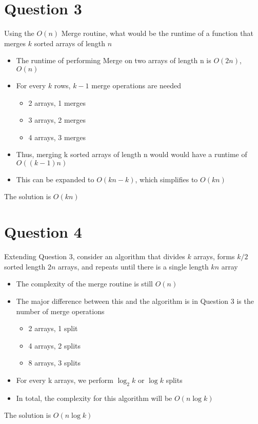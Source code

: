 \documentclass{report}
\begin{document}
    \section{Question 3}
    Using the $O(n)$ Merge routine, what would be the runtime of a function that merges $k$ sorted arrays of length $n$
        \begin{itemize}
            \item{The runtime of performing Merge on two arrays of length n is $O(2n)$, $O(n)$}
            \item{For every $k$ rows, $k - 1$ merge operations are needed}
                \begin{itemize}
                    \item{2 arrays, 1 merges}
                    \item{3 arrays, 2 merges}
                    \item{4 arrays, 3 merges}
                \end{itemize}
            \item{Thus, merging k sorted arrays of length n would would have a runtime of $O((k-1)n)$}
            \item{This can be expanded to $O(kn - k)$, which simplifies to $O(kn)$}
        \end{itemize}
        The solution is $O(kn)$

    \section{Question 4}
    Extending Question 3, consider an algorithm that divides $k$ arrays, forms $k/2$ sorted length $2n$ arrays,
    and repeats until there is a single length $kn$ array
        \begin{itemize}
            \item{The complexity of the merge routine is still $O(n)$}
            \item{The major difference between this and the algorithm is in Question 3 is the number of merge operations}
                \begin{itemize}
                  \item{2 arrays, 1 split}
                  \item{4 arrays, 2 splits}
                  \item{8 arrays, 3 splits}
                \end{itemize}
            \item{For every k arrays, we perform $\log_2 k$ or $\log k$ splits}
            \item{In total, the complexity for this algorithm will be \textbf{$O(n\log k)$}}
        \end{itemize}
        The solution is $O(n\log k)$
\end{document}
